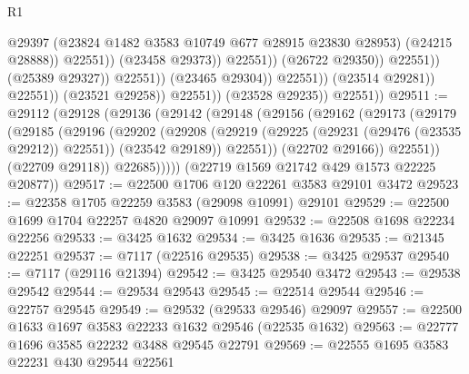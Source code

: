 \begin{lexlean}{R1}
\begin{coremodule}
                                                    @29397
                                                    (@23824
                                                      @1482
                                                      @3583
                                                      @10749
                                                      @677
                                                      @28915
                                                      @23830
                                                      @28953)
                                                    (@24215 @28888))
                                                  @22551))
                                              (@23458 @29373))
                                            @22551))
                                        (@26722 @29350))
                                      @22551))
                                  (@25389 @29327))
                                @22551))
                            (@23465 @29304))
                          @22551))
                      (@23514 @29281))
                    @22551))
                (@23521 @29258))
              @22551))
          (@23528 @29235))
        @22551))
@29511 := @29112
    (@29128
      (@29136
        (@29142
          (@29148
            (@29156
              (@29162
                (@29173
                  (@29179
                    (@29185
                      (@29196
                        (@29202
                          (@29208
                            (@29219
                              (@29225 (@29231 (@29476 (@23535 @29212)) @22551))
                              (@23542 @29189))
                            @22551))
                        (@22702 @29166))
                      @22551))
                  (@22709 @29118))
                @22685)))))
      (@22719 @1569 @21742 @429 @1573 @22225 @20877))
@29517 := @22500 @1706 @120 @22261 @3583 @29101 @3472
@29523 := @22358 @1705 @22259 @3583 (@29098 @10991) @29101
@29529 := @22500 @1699 @1704 @22257 @4820 @29097 @10991
@29532 := @22508 @1698 @22234 @22256
@29533 := @3425 @1632
@29534 := @3425 @1636
@29535 := @21345 @22251
@29537 := @7117 (@22516 @29535)
@29538 := @3425 @29537
@29540 := @7117 (@29116 @21394)
@29542 := @3425 @29540 @3472
@29543 := @29538 @29542
@29544 := @29534 @29543
@29545 := @22514 @29544
@29546 := @22757 @29545
@29549 := @29532 (@29533 @29546) @29097
@29557 := @22500 @1633 @1697 @3583 @22233 @1632 @29546 (@22535 @1632)
@29563 := @22777 @1696 @3585 @22232 @3488 @29545 @22791
@29569 := @22555 @1695 @3583 @22231 @430 @29544 @22561

\end{coremodule}
\end{lexlean}
